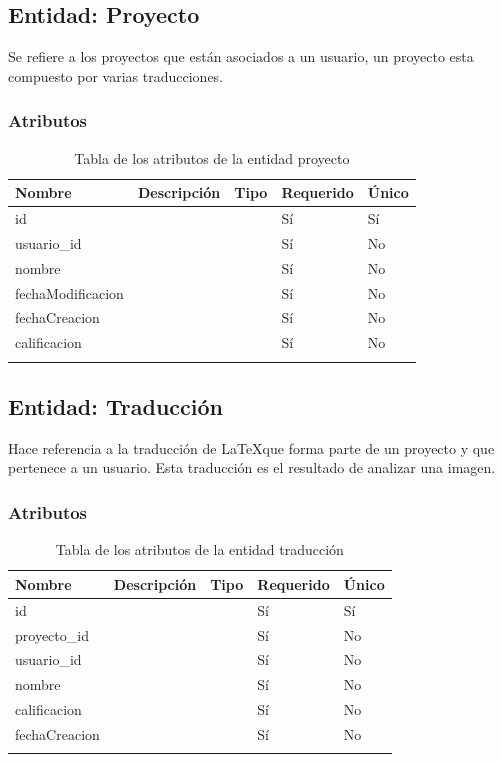\subsection{Entidad: Proyecto}
Se refiere a los proyectos que están asociados a un usuario, un proyecto esta compuesto por varias traducciones.
\subsubsection{Atributos}
\begin{center}
	\begin{longtable}{|J{3cm}|J{4cm}|J{3cm}|J{2cm}|J{2cm}|}
		\hline
		\textbf{Nombre} & \textbf{Descripción} & \textbf{Tipo} & \textbf{Requerido} & \textbf{Único} \\ \hline
		id & & & Sí & Sí \\ \hline
		usuario\_id & & & Sí & No \\ \hline
		nombre & & & Sí & No \\ \hline
		fechaModificacion & & & Sí & No \\ \hline
		fechaCreacion & & & Sí & No \\ \hline
		calificacion & & & Sí & No \\ \hline
		\caption{Tabla de los atributos de la entidad proyecto}
		\label{tbl:entidad-proyecto}
	\end{longtable}
\end{center}
\subsection{Entidad: Traducción}
Hace referencia a la traducción de \LaTeX que forma parte de un proyecto y que pertenece a un usuario. Esta traducción es el resultado de analizar una imagen.
\subsubsection{Atributos}
\begin{center}
	\begin{longtable}{|J{3cm}|J{4cm}|J{3cm}|J{2cm}|J{2cm}|}
		\hline
		\textbf{Nombre} & \textbf{Descripción} & \textbf{Tipo} & \textbf{Requerido} & \textbf{Único} \\ \hline
		id & & & Sí & Sí \\ \hline
		proyecto\_id & & & Sí & No \\ \hline
		usuario\_id & & & Sí & No \\ \hline
		nombre & & & Sí & No \\ \hline
		calificacion & & & Sí & No\\ \hline
		fechaCreacion & & & Sí & No \\ \hline
		\caption{Tabla de los atributos de la entidad traducción}
		\label{tbl:entidad-traduccion}
	\end{longtable}
\end{center}
